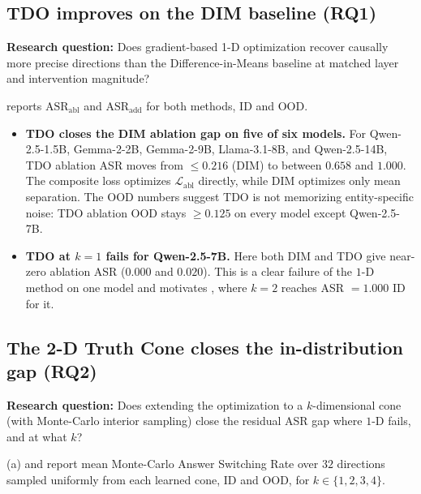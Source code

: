 \documentclass[sn-basic]{sn-jnl}
\newcommand{\Labl}{\mathcal{L}_{\text{abl}}}
\begin{document}
\subsection{TDO improves on the DIM baseline (RQ1)}
\label{sec:exp_tdo}

\textbf{Research question:} Does gradient-based 1-D optimization recover
causally more precise directions than the Difference-in-Means baseline at
matched layer and intervention magnitude?

 reports $\mathrm{ASR}_{\text{abl}}$ and
$\mathrm{ASR}_{\text{add}}$ for both methods, ID and OOD.

\begin{itemize}[leftmargin=*,nosep]
\item \textbf{TDO closes the DIM ablation gap on five of six models.} For
Qwen-2.5-1.5B, Gemma-2-2B, Gemma-2-9B, Llama-3.1-8B, and Qwen-2.5-14B, TDO
ablation ASR moves from $\le 0.216$ (DIM) to between $0.658$ and $1.000$. The
composite loss optimizes $\Labl$ directly, while DIM optimizes only mean
separation. The OOD numbers suggest TDO is not memorizing entity-specific noise:
TDO ablation OOD stays $\ge 0.125$ on every model except Qwen-2.5-7B.

\item \textbf{TDO at $k=1$ fails for Qwen-2.5-7B.} Here both DIM and TDO give
near-zero ablation ASR ($0.000$ and $0.020$). This is a clear failure of the
$1$-D method on one model and motivates , where $k=2$ reaches
ASR $= 1.000$ ID for it.
\end{itemize}



\subsection{The 2-D Truth Cone closes the in-distribution gap (RQ2)}
\label{sec:exp_cone}

\textbf{Research question:} Does extending the optimization to a $k$-dimensional
cone (with Monte-Carlo interior sampling) close the residual ASR gap where $1$-D
fails, and at what $k$?

(a) and  report mean Monte-Carlo Answer
Switching Rate over $32$ directions sampled uniformly from each learned cone, ID
and OOD, for $k \in \{1, 2, 3, 4\}$.
\end{document}
